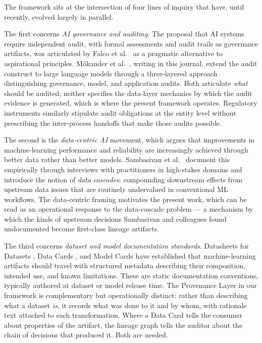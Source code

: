 \documentclass[11pt]{article}
\begin{document}
The framework sits at the intersection of four lines of inquiry that have, until recently, evolved largely in parallel.

The first concerns \emph{AI governance and auditing}. The proposal that AI systems require independent audit, with formal assessments and audit trails as governance artifacts, was articulated by Falco et al.\ \cite{Falco2021Governing} as a pragmatic alternative to aspirational principles. Mökander et al.\ \cite{Mokander2024AuditingLLMs}, writing in this journal, extend the audit construct to large language models through a three-layered approach distinguishing governance, model, and application audits. Both articulate \emph{what} should be audited; neither specifies the data-layer mechanics by which the audit evidence is generated, which is where the present framework operates. Regulatory instruments \cite{NIST_AIRM_2023,ISO_42001_2023,EU_AI_Act} similarly stipulate audit obligations at the entity level without prescribing the inter-process handoffs that make those audits possible.

The second is the \emph{data-centric AI} movement, which argues that improvements in machine-learning performance and reliability are increasingly achieved through better data rather than better models. Sambasivan et al.\ \cite{Sambasivan2021DataCascades} document this empirically through interviews with practitioners in high-stakes domains and introduce the notion of \emph{data cascades}: compounding downstream effects from upstream data issues that are routinely undervalued in conventional ML workflows. The data-centric framing motivates the present work, which can be read as an operational response to the data-cascade problem --- a mechanism by which the kinds of upstream decisions Sambasivan and colleagues found undocumented become first-class lineage artifacts.

The third concerns \emph{dataset and model documentation standards}. Datasheets for Datasets \cite{Gebru2021Datasheets}, Data Cards \cite{Pushkarna2022DataCards}, and Model Cards \cite{Mitchell2019ModelCards} have established that machine-learning artifacts should travel with structured metadata describing their composition, intended use, and known limitations. These are static documentation conventions, typically authored at dataset or model release time. The Provenance Layer in our framework is complementary but operationally distinct: rather than describing what a dataset \emph{is}, it records what was done to it and by whom, with rationale text attached to each transformation. Where a Data Card tells the consumer about properties of the artifact, the lineage graph tells the auditor about the chain of decisions that produced it. Both are needed.
\end{document}
